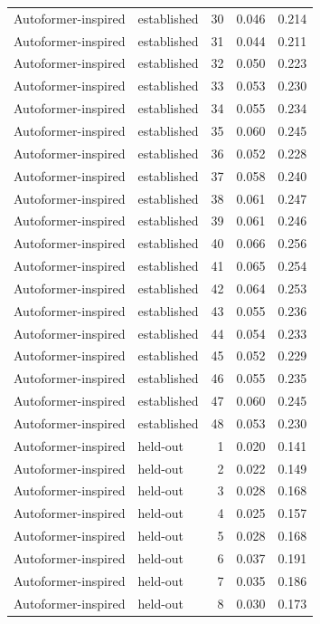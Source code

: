 \begin{tabular}{llrrr}
Autoformer-inspired & established & 30 & 0.046 & 0.214 \\
Autoformer-inspired & established & 31 & 0.044 & 0.211 \\
Autoformer-inspired & established & 32 & 0.050 & 0.223 \\
Autoformer-inspired & established & 33 & 0.053 & 0.230 \\
Autoformer-inspired & established & 34 & 0.055 & 0.234 \\
Autoformer-inspired & established & 35 & 0.060 & 0.245 \\
Autoformer-inspired & established & 36 & 0.052 & 0.228 \\
Autoformer-inspired & established & 37 & 0.058 & 0.240 \\
Autoformer-inspired & established & 38 & 0.061 & 0.247 \\
Autoformer-inspired & established & 39 & 0.061 & 0.246 \\
Autoformer-inspired & established & 40 & 0.066 & 0.256 \\
Autoformer-inspired & established & 41 & 0.065 & 0.254 \\
Autoformer-inspired & established & 42 & 0.064 & 0.253 \\
Autoformer-inspired & established & 43 & 0.055 & 0.236 \\
Autoformer-inspired & established & 44 & 0.054 & 0.233 \\
Autoformer-inspired & established & 45 & 0.052 & 0.229 \\
Autoformer-inspired & established & 46 & 0.055 & 0.235 \\
Autoformer-inspired & established & 47 & 0.060 & 0.245 \\
Autoformer-inspired & established & 48 & 0.053 & 0.230 \\
Autoformer-inspired & held-out & 1 & 0.020 & 0.141 \\
Autoformer-inspired & held-out & 2 & 0.022 & 0.149 \\
Autoformer-inspired & held-out & 3 & 0.028 & 0.168 \\
Autoformer-inspired & held-out & 4 & 0.025 & 0.157 \\
Autoformer-inspired & held-out & 5 & 0.028 & 0.168 \\
Autoformer-inspired & held-out & 6 & 0.037 & 0.191 \\
Autoformer-inspired & held-out & 7 & 0.035 & 0.186 \\
Autoformer-inspired & held-out & 8 & 0.030 & 0.173 \\

\end{tabular}
